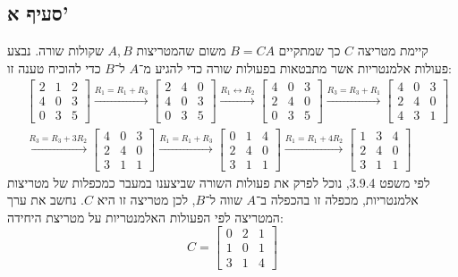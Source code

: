 \documentclass[a4paper, 10pt]{article}
\begin{document}
\begin{hebrew}
	\subsection{סעיף א'}
	קיימת מטריצה $C$ כך שמתקיים $B = CA$
	משום שהמטריצות $A, B$ שקולות שורה.
	נבצע פעולות אלמנטריות אשר מתבטאות בפעולות שורה כדי להגיע מ־$A$ ל־$B$
	כדי להוכיח טענה זו:
	\[
		\begin{aligned}
			& \begin{bmatrix}
				2 & 1 & 2 \\
				4 & 0 & 3 \\
				0 & 3 & 5
			\end{bmatrix}
			\xrightarrow{R_1 = R_1 + R_3}
			\begin{bmatrix}
				2 & 4 & 0 \\
				4 & 0 & 3 \\
				0 & 3 & 5
			\end{bmatrix}
			\xrightarrow{R_1 \leftrightarrow R_2}
			\begin{bmatrix}
				4 & 0 & 3 \\
				2 & 4 & 0 \\
				0 & 3 & 5
			\end{bmatrix}
			\xrightarrow{R_3 = R_3 + R_1}
			\begin{bmatrix}
				4 & 0 & 3 \\
				2 & 4 & 0 \\
				4 & 3 & 1
			\end{bmatrix} \\
			& \xrightarrow{R_3 = R_3 + 3R_2}
			\begin{bmatrix}
				4 & 0 & 3 \\
				2 & 4 & 0 \\
				3 & 1 & 1
			\end{bmatrix}
			\xrightarrow{R_1 = R_1 + R_3}
			\begin{bmatrix}
				0 & 1 & 4 \\
				2 & 4 & 0 \\
				3 & 1 & 1
			\end{bmatrix}
			\xrightarrow{R_1 = R_1 + 4R_2}
			\begin{bmatrix}
				1 & 3 & 4 \\
				2 & 4 & 0 \\
				3 & 1 & 1
			\end{bmatrix}
		\end{aligned}
	\]
	לפי משפט 3.9.4, נוכל לפרק את פעולות השורה שביצענו
	במעבר כמכפלות של מטריצות אלמנטריות,
	מכפלה זו בהכפלה ב־$A$ שווה ל־$B$, לכן מטריצה זו היא $C$.
	נחשב את ערך המטריצה לפי הפעולות האלמנטריות על מטריצת היחידה:
	\[
		C= \begin{bmatrix}
			0 & 2 & 1 \\
			1 & 0 & 1 \\
			3 & 1 & 4
		\end{bmatrix}
	\]


\end{hebrew}
\end{document}
